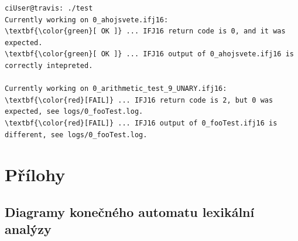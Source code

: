 \documentclass[a4paper,11pt]{article}
\begin{document}
\begin{Verbatim}
ciUser@travis: ./test
Currently working on 0_ahojsvete.ifj16:
\textbf{\color{green}[ OK ]} ... IFJ16 return code is 0, and it was expected.
\textbf{\color{green}[ OK ]} ... IFJ16 output of 0_ahojsvete.ifj16 is correctly intepreted.

Currently working on 0_arithmetic_test_9_UNARY.ifj16:
\textbf{\color{red}[FAIL]} ... IFJ16 return code is 2, but 0 was expected, see logs/0_fooTest.log.
\textbf{\color{red}[FAIL]} ... IFJ16 output of 0_fooTest.ifj16 is different, see logs/0_fooTest.log.
\end{Verbatim}

\section{Přílohy}
\subsection{Diagramy konečného automatu lexikální analýzy}
\label{diag:LA-FSM}
\end{document}
